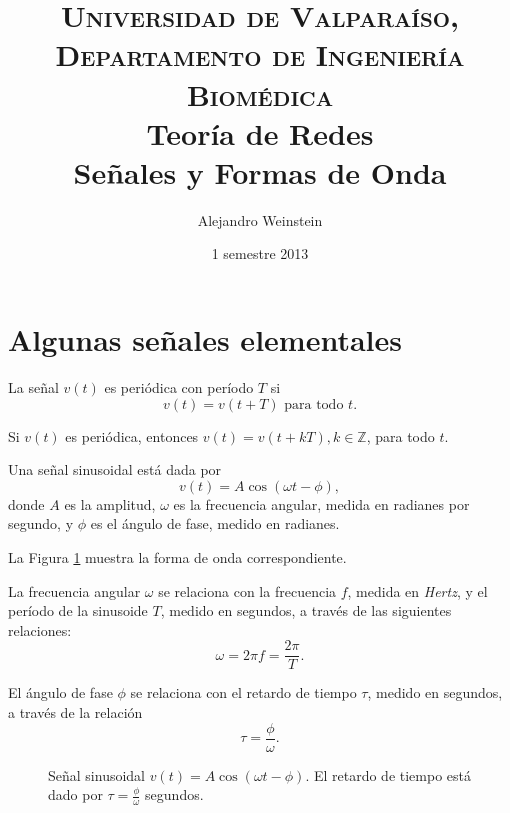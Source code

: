 \documentclass[paper=letter, fontsize=11pt]{scrartcl}
\title{
\normalfont \normalsize
\textsc{Universidad de Valparaíso, Departamento de Ingeniería Biomédica} \\
[25pt]
\huge Teoría de Redes \\ %
\LARGE Señales y Formas de Onda
}
\author{Alejandro Weinstein}
\date{\normalsize 1\ts{er} semestre 2013} %
\begin{document}
\maketitle

\section{Algunas señales elementales}

\begin{defi}

La señal $v(t)$ es periódica con período $T$ si
%
\begin{equation}
\label{eq:periodic}
  v(t) = v(t + T) \text{ para todo } t.
\end{equation}

\end{defi}

Si $v(t)$ es periódica, entonces $v(t) = v(t + kT), k \in \mathbb{Z}$, para
todo $t$.

\begin{defi}
  Una señal sinusoidal está dada por
  \begin{equation}
    v(t) = A \cos( \omega t - \phi),
  \end{equation}
%
  donde $A$ es la amplitud, $\omega$ es la frecuencia angular, medida en
  radianes por segundo, y $\phi$ es el ángulo de fase, medido en radianes.
\end{defi}

La Figura \ref{fig:sinusoid} muestra la forma de onda correspondiente.

La frecuencia angular $\omega$ se relaciona con la frecuencia $f$, medida en
\emph{Hertz}, y el período de la sinusoide $T$, medido en segundos, a través de
las siguientes relaciones:
%
\begin{equation}
  \omega = 2 \pi f = \frac{2\pi}{T}.
\end{equation}

El ángulo de fase $\phi$ se relaciona con el retardo de tiempo $\tau$, medido
en segundos, a través de la relación
%
\begin{equation}
  \tau = \frac{\phi}{\omega}.
\end{equation}

\begin{figure}[h!]
  \centering
  \caption{Señal sinusoidal $v(t) = A \cos(\omega t - \phi)$. El retardo de
    tiempo está dado por $\tau = \frac{\phi}{\omega}$ segundos.}
\label{fig:sinusoid}
\end{figure}
\end{document}
